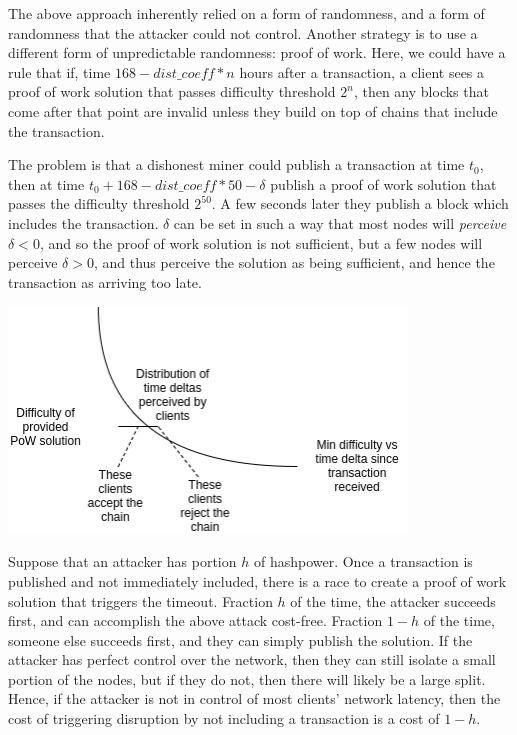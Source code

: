\documentclass[12pt]{article}
\begin{document}
The above approach inherently relied on a form of randomness, and a form of randomness that the attacker could not control. Another strategy is to use a different form of unpredictable randomness: proof of work. Here, we could have a rule that if, time $168 - dist\_coeff * n$ hours after a transaction, a client sees a proof of work solution that passes difficulty threshold $2^n$, then any blocks that come after that point are invalid unless they build on top of chains that include the transaction.

The problem is that a dishonest miner could publish a transaction at time $t_0$, then at time $t_0 + 168 - dist\_coeff * 50 - \delta$ publish a proof of work solution that passes the difficulty threshold $2^50$. A few seconds later they publish a block which includes the transaction. $\delta$ can be set in such a way that most nodes will \textit{perceive} $\delta < 0$, and so the proof of work solution is not sufficient, but a few nodes will perceive $\delta > 0$, and thus perceive the solution as being sufficient, and hence the transaction as arriving too late.

\includegraphics[width=400px]{Censorship7.png}

Suppose that an attacker has portion $h$ of hashpower. Once a transaction is published and not immediately included, there is a race to create a proof of work solution that triggers the timeout. Fraction $h$ of the time, the attacker succeeds first, and can accomplish the above attack cost-free. Fraction $1-h$ of the time, someone else succeeds first, and they can simply publish the solution. If the attacker has perfect control over the network, then they can still isolate a small portion of the nodes, but if they do not, then there will likely be a large split. Hence, if the attacker is not in control of most clients' network latency, then the cost of triggering disruption by not including a transaction is a cost of $1-h$.
\end{document}
